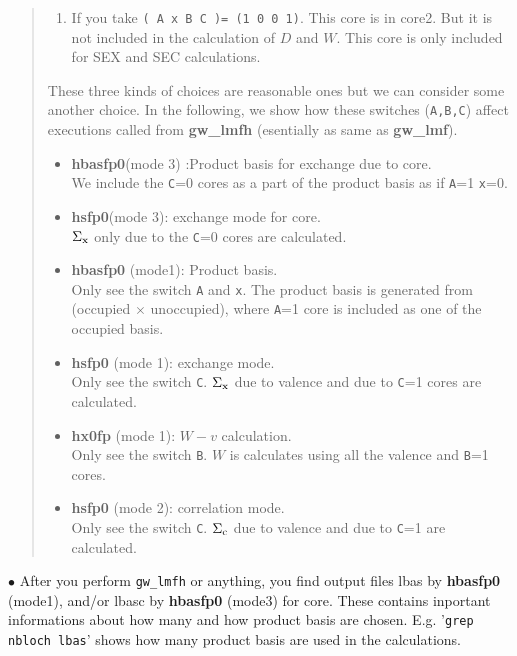 \documentclass[a4paper,10pt,epsf,fleqn]{article}
\newcommand{\exe}[1]{{\bf #1}}
\newcommand{\io}[1]{{\sf  #1}}
\newcommand{\raw}[1]{{\tt #1}}
\begin{document}
{\begin{quote}
\begin{enumerate}
\raw{C} is the key switch which determine whether it is included in core1 or core2.
There could be another option.

\item 
If you take
{\tt ( A  x   B    C )= (1 0 0 1)}.
This core is in core2. But it is not included in the calculation of $D$ and $W$.
This core is only included for SEX and SEC calculations.
\end{enumerate}
These three kinds of choices are reasonable ones but we can consider some another choice.
In the following, we show how these switches (\verb#A,B,C#) affect executions called from 
\exe{gw\_lmfh} (esentially as same as \exe{gw\_lmf}).
\begin{itemize}
\item 
\exe{hbasfp0}(mode 3) :Product basis for exchange due to core.\\
We include the \raw{C}=0 cores as a part of
the product basis as if \raw{A}=1 \raw{x}=0.

\item 
\exe{hsfp0}(mode 3): exchange mode for core.\\
$\Sigma_{\rm x}$ only due to the \raw{C}=0 cores are calculated.

\item 
\exe{hbasfp0} (mode1): Product basis.\\
Only see the switch \raw{A} and \raw{x}.
The product basis is generated from (occupied $\times$ unoccupied), 
where \raw{A}=1 core is included as one of the occupied basis.

\item 
\exe{hsfp0} (mode 1): exchange mode.\\
Only see the switch \raw{C}.
$\Sigma_{\rm x}$ due to valence and due to \raw{C}=1 cores
are calculated.

\item 
\exe{hx0fp} (mode 1): $W-v$ calculation.\\
Only see the switch \raw{B}.
$W$ is calculates using all the valence and \raw{B}=1 cores.

\item 
\exe{hsfp0} (mode 2): correlation mode.\\
Only see the switch \raw{C}.
$\Sigma_{\rm c}$ due to valence and due to \raw{C}=1 are calculated.

\end{itemize}

\end{quote}

\noindent $\bullet$ After you perform \verb#gw_lmfh# or anything,
you find output files \io{lbas} by \exe{hbasfp0} (mode1), and/or \io{lbasc}
by \exe{hbasfp0} (mode3) for core. These contains inportant informations
about how many and how product basis are chosen. 
E.g. '\verb#grep nbloch lbas#' shows how many product basis are used in the calculations.



}
\end{document}
